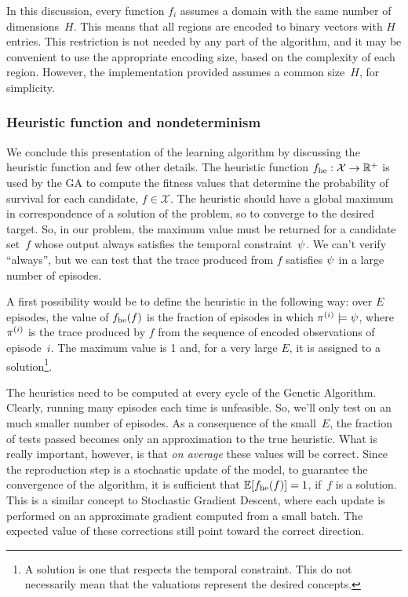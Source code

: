 In this discussion, every function $f_i$ assumes a domain with the same number
of dimensions~$H$. This means that all regions are encoded to binary vectors
with $H$ entries. This restriction is not needed by any part of the algorithm,
and it may be convenient to use the appropriate encoding size, based on the
complexity of each region. However, the implementation provided assumes a
common size~$H$, for simplicity.


\subsubsection{Heuristic function and nondeterminism}

We conclude this presentation of the learning algorithm by discussing the
heuristic function and few other details. The heuristic function
$f_{\text{he}}: \mathcal{X} \to \mathbb{R}^+$ is used by the GA to compute the fitness
values that determine the probability of survival for each candidate, $f \in
\mathcal{X}$. The heuristic should have a global maximum in correspondence of
a solution of the problem, so to converge to the desired target. So, in our
problem, the maximum value must be returned for a candidate set~$f$ whose
output always satisfies the temporal constraint~$\psi$.  We can't
verify ``always'', but we can test that the trace produced from $f$ satisfies
$\psi$ in a large number of episodes.

A first possibility would be to define the heuristic in the following way:
over $E$ episodes, the value of $f_{\text{he}}(f)$ is the fraction of episodes
in which $\pi^{(i)} \models \psi$, where $\pi^{(i)}$ is
the trace produced by $f$ from the sequence of encoded observations of
episode~$i$. The maximum value is 1 and, for a very large $E$, it is assigned
to a solution\footnote{A solution is one that respects the temporal
constraint.  This do not necessarily mean that the valuations represent the
desired concepts.}.

The heuristics need to be computed at every cycle of the Genetic Algorithm.
Clearly, running many episodes each time is unfeasible. So, we'll only test on
an much smaller number of episodes.  As a consequence of the small~$E$, the
fraction of tests passed becomes only an approximation to the true heuristic.
What is really important, however, is that \emph{on average} these values will
be correct. Since the reproduction step is a stochastic update of the model,
to guarantee the convergence of the algorithm, it is sufficient that
$\mathbb{E}[f_{\text{he}}(f)] = 1$, if~$f$ is a solution. This is a similar concept to
Stochastic Gradient Descent, where each update is performed on an approximate
gradient computed from a small batch. The expected value of these corrections
still point toward the correct direction.


